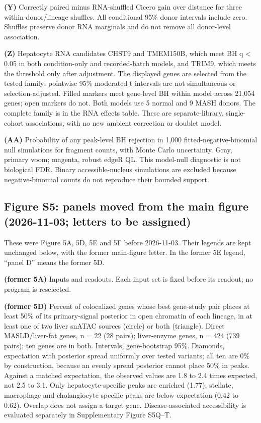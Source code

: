 \textbf{(Y)} Correctly paired minus RNA-shuffled Cicero gain over distance for three within-donor/lineage shuffles. All conditional 95\% donor intervals include zero. Shuffles preserve donor RNA marginals and do not remove all donor-level association.

\textbf{(Z)} Hepatocyte RNA candidates CHST9 and TMEM150B, which meet BH q \textless{} 0.05 in both condition-only and recorded-batch models, and TRIM9, which meets the threshold only after adjustment. The displayed genes are selected from the tested family; pointwise 95\% moderated-t intervals are not simultaneous or selection-adjusted. Filled markers meet gene-level BH within model across 21,054 genes; open markers do not. Both models use 5 normal and 9 MASH donors. The complete family is in the RNA effects table. These are separate-library, single-cohort associations, with no new ambient correction or doublet model.

\textbf{(AA)} Probability of any peak-level BH rejection in 1,000 fitted-negative-binomial null simulations for fragment counts, with Monte Carlo uncertainty. Gray, primary voom; magenta, robust edgeR QL. This model-null diagnostic is not biological FDR. Binary accessible-nucleus simulations are excluded because negative-binomial counts do not reproduce their bounded support.

\subsection{Figure S5: panels moved from the main figure (2026-11-03; letters to be assigned)}\label{figure-s5-panels-moved-from-the-main-figure-2026-11-03-letters-to-be-assigned}

These were Figure 5A, 5D, 5E and 5F before 2026-11-03. Their legends are kept unchanged below, with the former main-figure letter. In the former 5E legend, ``panel D'' means the former 5D.

\textbf{(former 5A)} Inputs and readouts. Each input set is fixed before its readout; no program is reselected.

\textbf{(former 5D)} Percent of colocalized genes whose best gene-study pair places at least 50\% of its primary-signal posterior in open chromatin of each lineage, in at least one of two liver snATAC sources (circle) or both (triangle). Direct MASLD/liver-fat genes, n = 22 (28 pairs); liver-enzyme genes, n = 424 (739 pairs); ten genes are in both. Intervals, gene-bootstrap 95\%. Diamonds, expectation with posterior spread uniformly over tested variants; all ten are 0\% by construction, because an evenly spread posterior cannot place 50\% in peaks. Against a matched expectation, the observed values are 1.8 to 2.4 times expected, not 2.5 to 3.1. Only hepatocyte-specific peaks are enriched (1.77); stellate, macrophage and cholangiocyte-specific peaks are below expectation (0.42 to 0.62). Overlap does not assign a target gene. Disease-associated accessibility is evaluated separately in Supplementary Figure S5Q--T.

